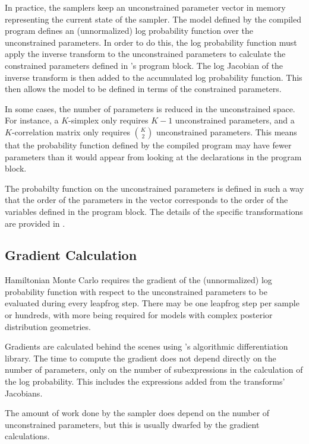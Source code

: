 In practice, the samplers keep an unconstrained parameter vector in
memory representing the current state of the sampler.  The model
defined by the compiled \Stan program defines an (unnormalized) log
probability function over the unconstrained parameters.  In order to
do this, the log probability function must apply the inverse transform
to the unconstrained parameters to calculate the constrained
parameters defined in \Stan's  program block.  The
log Jacobian of the inverse transform is then added to the accumulated
log probability function.  This then allows the \Stan model to be
defined in terms of the constrained parameters.

In some cases, the number of parameters is reduced in the
unconstrained space.  For instance, a $K$-simplex only requires $K-1$
unconstrained parameters, and a $K$-correlation matrix only requires
${K \choose 2}$ unconstrained parameters.  This means that the
probability function defined by the compiled \Stan program may have
fewer parameters than it would appear from looking at the declarations
in the  program block. 

The probabilty function on the unconstrained parameters is defined in
such a way that the order of the parameters in the vector corresponds
to the order of the variables defined in the  program
block.  The details of the specific transformations are provided in
.

\subsection{Gradient Calculation}

Hamiltonian Monte Carlo requires the gradient of the (unnormalized)
log probability function with respect to the unconstrained parameters
to be evaluated during every leapfrog step.  There may be one leapfrog
step per sample or hundreds, with more being required for models with
complex posterior distribution geometries.

Gradients are calculated behind the scenes using \Stan's algorithmic
differentiation library.  The time to compute the gradient does not
depend directly on the number of parameters, only on the number of
subexpressions in the calculation of the log probability.  This
includes the expressions added from the transforms' Jacobians.  

The amount of work done by the sampler does depend on the number of
unconstrained parameters, but this is usually dwarfed by the gradient
calculations.

